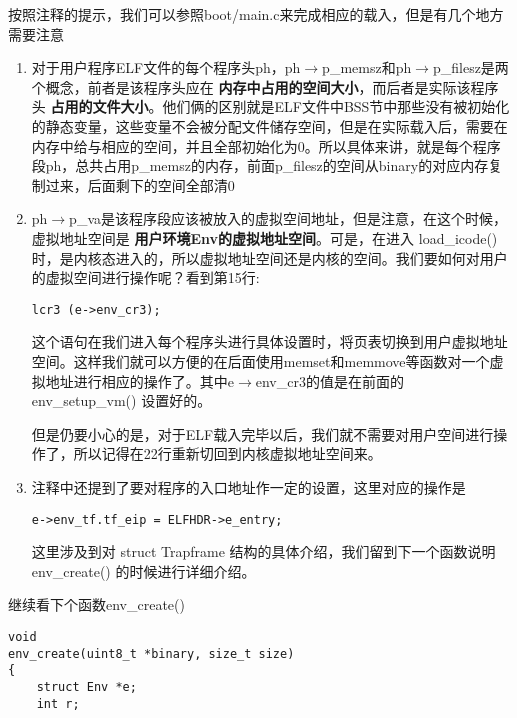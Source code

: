 \documentclass{article}
\newcommand{\highlight}[1]{{\bfseries \color{red}  #1}}
\newcommand{\funcname}[1]{{\ttfamily \small #1}}
\begin{document}
\begin{CJK*}{UTF8}{gkai}
按照注释的提示，我们可以参照boot/main.c来完成相应的载入，但是有几个地方需要注意

\begin{enumerate}
\item{对于用户程序ELF文件的每个程序头ph，ph$\rightarrow$p\_memsz和ph$\rightarrow$p\_filesz是两个概念，前者是该程序头应在\highlight{内存中占用的空间大小}，而后者是实际该程序头\highlight{占用的文件大小}。他们俩的区别就是ELF文件中BSS节中那些没有被初始化的静态变量，这些变量不会被分配文件储存空间，但是在实际载入后，需要在内存中给与相应的空间，并且全部初始化为0。所以具体来讲，就是每个程序段ph，总共占用p\_memsz的内存，前面p\_filesz的空间从binary的对应内存复制过来，后面剩下的空间全部清0}
\item{ph$\rightarrow$p\_va是该程序段应该被放入的虚拟空间地址，但是注意，在这个时候，虚拟地址空间是\highlight{用户环境Env的虚拟地址空间}。可是，在进入 \funcname{load\_icode()} 时，是内核态进入的，所以虚拟地址空间还是内核的空间。我们要如何对用户的虚拟空间进行操作呢？看到第15行:

\begin{lstlisting}[style=ccode, firstnumber=15, title={\scriptsize \ttfamily \bfseries kern/env.c: load\_icode ()}]
    lcr3 (e->env_cr3);
\end{lstlisting}

这个语句在我们进入每个程序头进行具体设置时，将页表切换到用户虚拟地址空间。这样我们就可以方便的在后面使用memset和memmove等函数对一个虚拟地址进行相应的操作了。其中e$\rightarrow$env\_cr3的值是在前面的 \funcname{env\_setup\_vm()} 设置好的。

但是仍要小心的是，对于ELF载入完毕以后，我们就不需要对用户空间进行操作了，所以记得在22行重新切回到内核虚拟地址空间来。}
\item{注释中还提到了要对程序的入口地址作一定的设置，这里对应的操作是
\begin{lstlisting}[style=ccode, firstnumber=24, title={\scriptsize \ttfamily \bfseries kern/env.c: load\_icode ()}]
    e->env_tf.tf_eip = ELFHDR->e_entry;
\end{lstlisting}

这里涉及到对 struct Trapframe 结构的具体介绍，我们留到下一个函数说明 \funcname{env\_create()} 的时候进行详细介绍。
}
\end{enumerate}


\vspace{2em}

继续看下个函数\funcname{env\_create()}

\begin{lstlisting}[style=ccode, title={\scriptsize \ttfamily \bfseries kern/env.c: env\_create()}]
void
env_create(uint8_t *binary, size_t size)
{
    struct Env *e;
    int r;


\end{lstlisting}
\end{CJK*}
\end{document}

